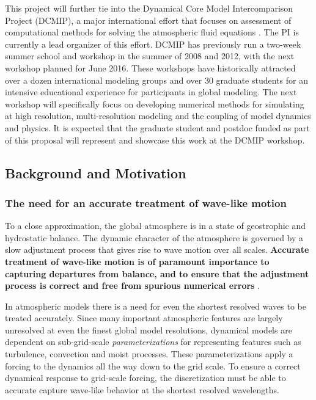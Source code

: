\documentclass[11pt]{article}
\begin{document}
This project will further tie into the Dynamical Core Model Intercomparison Project (DCMIP), a major international effort that focuses on assessment of computational methods for solving the atmospheric fluid equations \cite{DCMIP2012TESTCASES,kent2013dynamical}.  The PI is currently a lead organizer of this effort.  DCMIP has previously run a two-week summer school and workshop in the summer of 2008 and 2012, with the next workshop planned for June 2016.  These workshops have historically attracted over a dozen international modeling groups and over 30 graduate students for an intensive educational experience for participants in global modeling.  The next workshop will specifically focus on developing numerical methods for simulating at high resolution, multi-resolution modeling and the coupling of model dynamics and physics.  It is expected that the graduate student and postdoc funded as part of this proposal will represent and showcase this work at the DCMIP workshop.

\subsection{Background and Motivation} \label{sec:BackgroundMotivation}

\subsubsection{The need for an accurate treatment of wave-like motion} \label{sec:AccurateWaves}

To a close approximation, the global atmosphere is in a state of geostrophic and hydrostatic balance.  The dynamic character of the atmosphere is governed by a slow adjustment process that gives rise to wave motion over all scales.  \textbf{Accurate treatment of wave-like motion is of paramount importance to capturing departures from balance, and to ensure that the adjustment process is correct and free from spurious numerical errors} \cite{randall1994geostrophic, thuburn2005vertical}.

In atmospheric models there is a need for even the shortest resolved waves to be treated accurately.  Since many important atmospheric features are largely unresolved at even the finest global model resolutions, dynamical models are dependent on sub-grid-scale \textit{parameterizations} for representing features such as turbulence, convection and moist processes.  These parameterizations apply a forcing to the dynamics all the way down to the grid scale.  To ensure a correct dynamical response to grid-scale forcing, the discretization must be able to accurate capture wave-like behavior at the shortest resolved wavelengths.
\end{document}
